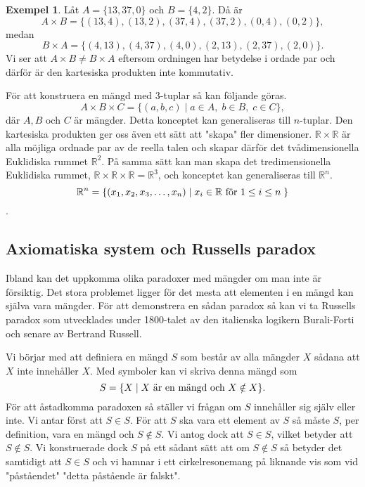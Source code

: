 \documentclass{article}
\theoremstyle{definition}
\newtheorem{exmp}[thm]{Exempel}
\begin{document}
\begin{exmp}
  Låt $A = \{13, 37, 0\}$ och $B = \{4, 2\}$. Då är
\[A \times B = \{ (13, 4), (13, 2), (37, 4), (37, 2), (0, 4), (0, 2) \},\]
medan 
\[B \times A = \{ (4, 13), (4, 37), (4, 0), (2, 13), (2, 37), (2, 0) \}.\]
Vi ser att $A \times B \neq B \times A$ eftersom ordningen
har betydelse i ordade par och därför är den kartesiska produkten inte kommutativ. 
\end{exmp}
För att konstruera en mängd med $3$-tuplar så kan följande göras.
\[A \times B \times C = \{ (a, b, c) \; | \; a \in A, \; b \in B, \; c \in C \},\]
där $A, B$ och $C$ är mängder. Detta konceptet kan generaliseras till $n$-tuplar. 
Den kartesiska produkten ger oss även ett sätt att "skapa" fler dimensioner.
$\mathbb{R} \times \mathbb{R}$ är alla möjliga ordnade par av de reella talen och skapar därför det 
tvådimensionella Euklidiska rummet $\mathbb{R}^2$. På samma sätt kan man skapa det tredimensionella Euklidiska rummet,
$\mathbb{R} \times \mathbb{R} \times \mathbb{R} = \mathbb{R}^3$, och konceptet kan generaliseras till 
$\mathbb{R}^n$. 
\[\mathbb{R}^n = \{(x_1, x_2, x_3, \ldots, x_n) \; | \; x_i \in \mathbb{R} \textnormal{ för } 1 
\leq i \leq n\; \} \].


\subsection{Axiomatiska system och Russells paradox}
Ibland kan det uppkomma olika paradoxer med mängder om man inte är försiktig. Det stora problemet 
ligger för det mesta att elementen i en mängd kan själva vara mängder. För att demonstrera en sådan 
paradox så kan vi ta Russells paradox som utvecklades under 1800-talet av den italienska logikern Burali-Forti
och senare av Bertrand Russell. 

Vi börjar med att definiera en mängd $S$ som består av alla mängder $X$ sådana att $X$ inte innehåller 
$X$. Med symboler kan vi skriva denna mängd som
\[S = \{X \; | \; X \textnormal{ är en mängd och } X \notin X  \}. \]
För att åstadkomma paradoxen så ställer vi frågan om $S$ innehåller sig själv eller inte. 
Vi antar först att $S \in S$.
För att $S$ ska vara ett element av $S$ så 
måste $S$, per definition, vara en mängd och $S \notin S$.
Vi antog dock att $S \in S$, vilket betyder att $S \notin S$. Vi konstruerade dock $S$ på ett sådant sätt att om $S \notin S$ så betyder det samtidigt att $S \in S$ och vi hamnar i ett
cirkelresonemang på liknande vis som vid "påståendet" "detta påstående är falskt".
\end{document}
